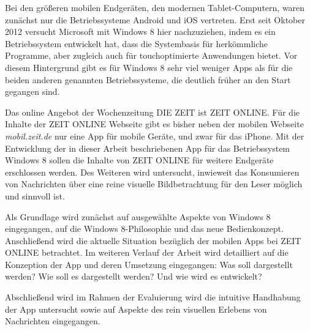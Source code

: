 \documentclass[12pt,a4paper,bibtotoc,abstracton]{scrartcl}
\begin{document}
Bei den größeren mobilen Endgeräten, den modernen Tablet-Computern, waren zunächst nur die Betriebssysteme Android und iOS vertreten. Erst seit Oktober 2012 versucht Microsoft mit Windows 8 hier nachzuziehen, indem es ein Betriebssystem entwickelt hat, dass die Systembasis für herkömmliche Programme, aber zugleich auch für touchoptimierte Anwendungen bietet. Vor diesem Hintergrund gibt es für Windows 8 sehr viel weniger Apps als für die beiden anderen genannten Betriebssysteme, die deutlich früher an den Start gegangen sind.

Das online Angebot der Wochenzeitung DIE ZEIT ist ZEIT ONLINE. 
Für die Inhalte der ZEIT ONLINE Webseite gibt es bisher neben der mobilen Webseite \textit{mobil.zeit.de} nur eine App für mobile Geräte, und zwar für das iPhone. Mit der Entwicklung der in dieser Arbeit beschriebenen App für das Betriebssystem Windows 8 sollen die Inhalte von ZEIT ONLINE für weitere Endgeräte erschlossen werden. Des Weiteren wird untersucht, inwieweit das Konsumieren von Nachrichten über eine reine visuelle  Bildbetrachtung für den Leser möglich und sinnvoll ist. 

Als Grundlage wird zunächst auf ausgewählte Aspekte von Windows 8 eingegangen, auf die Windows 8-Philosophie und das neue Bedienkonzept. Anschließend wird die aktuelle Situation bezüglich der mobilen Apps bei ZEIT ONLINE betrachtet. Im weiteren Verlauf der Arbeit wird detailliert auf die Konzeption der App und deren Umsetzung eingegangen: Was soll dargestellt werden? Wie soll es dargestellt werden? Und wie wird es entwickelt?

Abschließend wird im Rahmen der Evaluierung wird die intuitive Handhabung der App untersucht sowie auf Aspekte des rein visuellen Erlebens von Nachrichten eingegangen.



\newpage
\end{document}
